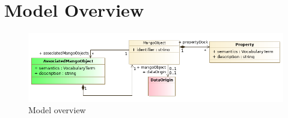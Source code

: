 \documentclass[11pt,a4paper]{ivoa}
\begin{document}
%



\section{Model Overview}

\begin{figure}
     \includegraphics[width=1.0\textwidth]{../model/overview.png}
     \caption{Model overview}
     \label{overview}
\end{figure}
\end{document}
